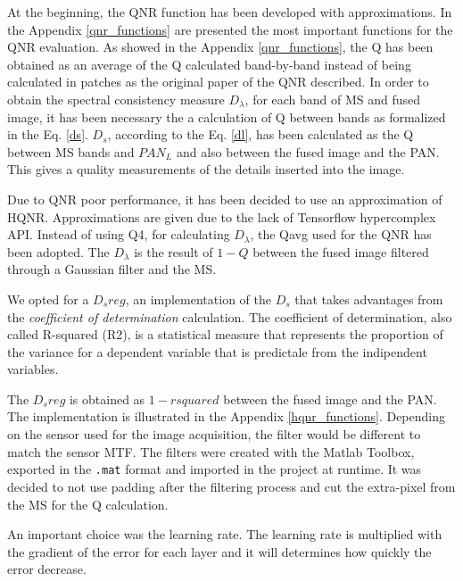 \documentclass[12pt]{report}
\begin{document}
At the beginning, the QNR function has been developed with approximations. 
In the Appendix \ref{qnr_functions} are presented the most important functions for the QNR evaluation.
As showed in the Appendix \ref{qnr_functions}, the Q has been obtained as an average of the Q calculated band-by-band
instead of being calculated in patches as the original paper of the QNR described.
In order to obtain the spectral consistency measure $D_\lambda$, for each band of MS and fused image, 
it has been necessary the a calculation of Q between bands as formalized in the Eq. \ref{ds}.
$D_s$, according to the Eq. \ref{dl}, has been calculated as the Q between MS bands and $PAN_L$ and also between the fused image and the PAN.
This gives a quality measurements of the details inserted into the image. 

Due to QNR poor performance, it has been decided to use an approximation of HQNR. 
Approximations are given due to the lack of Tensorflow hypercomplex API.
Instead of using Q4, for calculating $D_\lambda$, the Qavg used for the QNR has been adopted.
The $D_\lambda$ is the result of $1 - Q$ between the fused image filtered through a Gaussian filter and the MS.

We opted for a $D_sreg$, an implementation of the $D_s$ that takes advantages from the \textit{coefficient of determination} calculation. 
The coefficient of determination, also called R-squared (R2), is a statistical measure that represents the proportion of the variance for a dependent variable that is predictale from the indipendent variables.

The $D_sreg$ is obtained as $1 - rsquared$ between the fused image and the PAN. 
The implementation is illustrated in the Appendix \ref{hqnr_functions}.
Depending on the sensor used for the image acquisition, the filter would be different to match the sensor MTF.
The filters were created with the Matlab Toolbox, exported in the \texttt{.mat} format and imported in the project at runtime.
It was decided to not use padding after the filtering process and cut the extra-pixel from the MS for the Q calculation.  

An important choice was the learning rate. The learning rate is multiplied with the gradient of the error for each layer
and it will determines how quickly the error decrease. 
\end{document}
